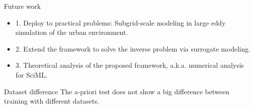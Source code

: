 \documentclass[paper slide]{beamer}
\begin{document}
\begin{frame}{Future work}
	\begin{itemize}
		\item 1. Deploy to practical problems: Subgrid-scale modeling in large eddy simulation of the
		urban environment.
		\item 2. Extend the framework to solve the inverse problem via surrogate modeling.
		\item 3. Theoretical analysis of the proposed framework, a.k.a. numerical analysis for SciML.
	\end{itemize}
\end{frame}

\begin{frame}{Dataset difference}
	The a-priori test does not show a big difference between training with different datasets.
\end{frame}
\end{document}
